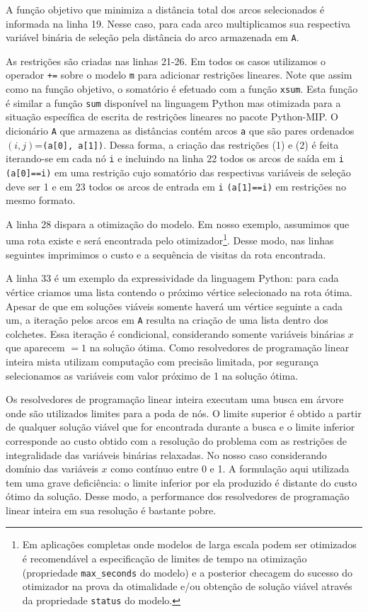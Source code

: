 \documentclass[a4paper,11pt,fleqn]{article}
\begin{document}
A função objetivo que minimiza a distância total dos arcos selecionados é informada na linha 19. Nesse caso, para cada arco multiplicamos sua respectiva variável binária de seleção pela distância do arco armazenada em \texttt{A}.

As restrições são criadas nas linhas 21-26. Em todos os casos utilizamos o operador \texttt{+=} sobre o modelo \texttt{m} para adicionar restrições lineares. Note que assim como na função objetivo, o somatório é efetuado com a função \texttt{xsum}. Esta função é similar a função \texttt{sum} disponível na linguagem Python mas otimizada para a situação específica de escrita de restrições lineares no pacote Python-MIP. O dicionário \texttt{A} que armazena as distâncias contém arcos \texttt{a} que são pares ordenados $(i,j)$=\texttt{(a[0], a[1])}. Dessa forma, a criação das restrições (1) e (2) é feita iterando-se em cada nó \texttt{i} e incluindo na linha 22 todos os arcos de saída em \texttt{i} \texttt{(a[0]==i)} em uma restrição cujo somatório das respectivas variáveis de seleção deve ser 1 e em 23 todos os arcos de entrada em \texttt{i} \texttt{(a[1]==i)} em restrições no mesmo formato.

A linha 28 dispara a otimização do modelo. Em nosso exemplo, assumimos que uma rota existe e será encontrada pelo otimizador\footnote{Em aplicações completas onde modelos de larga escala podem ser otimizados é recomendável a especificação de limites de tempo na otimização (propriedade \texttt{max\_seconds} do modelo) e a posterior checagem do sucesso do otimizador na prova da otimalidade e/ou obtenção de solução viável através da propriedade \texttt{status} do modelo.}. Desse modo, nas linhas seguintes imprimimos o custo e a sequência de visitas da rota encontrada. 

A linha 33 é um exemplo da expressividade da linguagem Python: para cada vértice criamos uma lista contendo o próximo vértice selecionado na rota ótima. Apesar de que em soluções viáveis somente haverá um vértice seguinte a cada um, a iteração pelos arcos em \texttt{A} resulta na criação de uma lista dentro dos colchetes. Essa iteração é condicional, considerando somente variáveis binárias $x$ que aparecem $=1$ na solução ótima. Como resolvedores de programação linear inteira mista utilizam computação com precisão limitada, por segurança selecionamos as variáveis com valor próximo de 1 na solução ótima. 

Os resolvedores de programação linear inteira executam uma busca em árvore onde são utilizados limites para a poda de nós. O limite superior é obtido a partir de qualquer solução viável que for encontrada durante a busca e o limite inferior corresponde ao custo obtido com a resolução do problema com as restrições de integralidade das variáveis binárias relaxadas. No nosso caso considerando domínio das variáveis $x$ como contínuo entre 0 e 1. A formulação aqui utilizada tem uma grave deficiência: o limite inferior por ela produzido é distante do custo ótimo da solução. Desse modo, a performance dos resolvedores de programação linear inteira em sua resolução é bastante pobre. 
\end{document}

